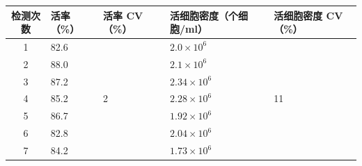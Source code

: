 \documentclass[UTF8,10pt,a4paper,fontset=fandol]{ctexart}
\newcommand{\fieldvalue}[1]{#1}
\newcommand{\handwritten}[1]{#1}
\begin{document}
\begin{center}
\begin{center}
\small
\begin{tabularx}{\textwidth}{|c|X|X|X|X|}
\hline
检测次数 & 活率（\%） & 活率 CV（\%） & 活细胞密度（个细胞/ml） & 活细胞密度 CV（\%） \\
\hline
1 &
\fieldvalue{\handwritten{82.6}} &
\multirow{9}{*}{
\fieldvalue{\handwritten{2}}} &
\fieldvalue{\handwritten{$2.0\times10^{6}$}} &
\multirow{9}{*}{
\fieldvalue{\handwritten{11}}} \\
\hline
2 &
\fieldvalue{\handwritten{88.0}} &
&
\fieldvalue{\handwritten{$2.1\times10^{6}$}} & \\
\hline
3 &
\fieldvalue{\handwritten{87.2}} &
&
\fieldvalue{\handwritten{$2.34\times10^{6}$}} & \\
\hline
4 &
\fieldvalue{\handwritten{85.2}} &
&
\fieldvalue{\handwritten{$2.28\times10^{6}$}} & \\
\hline
5 &
\fieldvalue{\handwritten{86.7}} &
&
\fieldvalue{\handwritten{$1.92\times10^{6}$}} & \\
\hline
6 &
\fieldvalue{\handwritten{82.8}} &
&
\fieldvalue{\handwritten{$2.04\times10^{6}$}} & \\
\hline
7 &
\fieldvalue{\handwritten{84.2}} &
&
\fieldvalue{\handwritten{$1.73\times10^{6}$}} & \\

\end{tabularx}
\end{center}
\end{center}
\end{document}
